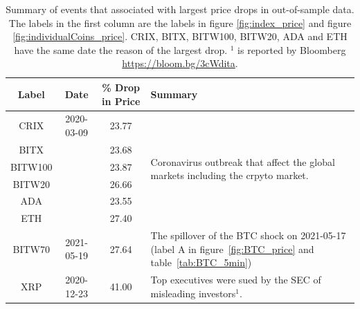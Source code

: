 \begin{table}[!]
    \centering
      \begin{tabularx}{.8\textwidth}{cccX}
        \toprule
        Label &  Date & \% Drop in Price &  Summary\\
        \midrule
        CRIX    &2020-03-09 & 23.77 & \multirow[t]{6}{\hsize}{Coronavirus outbreak that affect the global markets including the crpyto market.}\\
        BITX    & & 23.68 &  \\
        BITW100 & & 23.87 &  \\
        BITW20  & & 26.66 &  \\
        ADA     & &23.55 &  \\
        ETH     & &27.40 &  \\
        BITW70  & 2021-05-19& 27.64 & The spillover of the BTC shock on 2021-05-17 (label A in figure~\ref{fig:BTC_price} and table~\ref{tab:BTC_5min})\\
        XRP     & 2020-12-23 & 41.00 & Top executives were sued by the SEC of misleading investors$^1$. \\
        \bottomrule
      \end{tabularx}
        \caption{Summary of events that associated with largest price drops in out-of-sample data.
        The labels in the first column are the labels in figure \ref{fig:index_price} and figure \ref{fig:individualCoins_price}.
        CRIX, BITX, BITW100, BITW20, ADA and ETH have the same date the reason of the largest drop. $^1$ is reported by Bloomberg \url{https://bloom.bg/3cWdita}.}
        \label{tab:All_min}
  \end{table}


